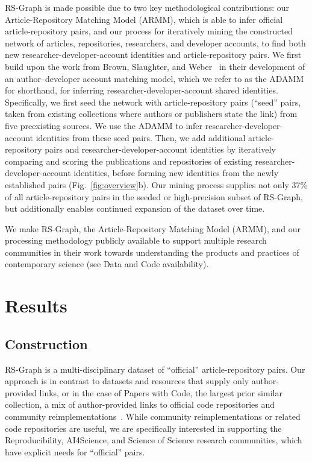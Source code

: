 \documentclass[pdflatex,sn-nature]{sn-jnl}%
\begin{document}
RS-Graph is made possible due to two key methodological contributions: our Article-Repository Matching Model (ARMM), which is able to infer official article-repository pairs, and our process for iteratively mining the constructed network of articles, repositories, researchers, and developer accounts, to find both new researcher-developer-account identities and article-repository pairs. We first build upon the work from Brown, Slaughter, and Weber~\cite{brown2026code} in their development of an author--developer account matching model, which we refer to as the ADAMM for shorthand, for inferring researcher-developer-account shared identities. Specifically, we first seed the network with article-repository pairs (``seed'' pairs, taken from existing collections where authors or publishers state the link) from five preexisting sources. We use the ADAMM to infer researcher-developer-account identities from these seed pairs. Then, we add additional article-repository pairs and researcher-developer-account identities by iteratively comparing and scoring the publications and repositories of existing researcher-developer-account identities, before forming new identities from the newly established pairs (Fig.~\ref{fig:overview}b). Our mining process supplies not only 37\% of all article-repository pairs in the seeded or high-precision subset of RS-Graph, but additionally enables continued expansion of the dataset over time.

We make RS-Graph, the Article-Repository Matching Model (ARMM), and our processing methodology publicly available to support multiple research communities in their work towards understanding the products and practices of contemporary science (see Data and Code availability).

\section{Results}\label{sec:results}

\subsection{Construction}\label{subsec:construction}

RS-Graph is a multi-disciplinary dataset of ``official'' article-repository pairs. Our approach is in contrast to datasets and resources that supply only author-provided links, or in the case of Papers with Code, the largest prior similar collection, a mix of author-provided links to official code repositories and community reimplementations~\cite{farber2023linked,ciuciukiss2025study,puangjaktha2024paper}. While community reimplementations or related code repositories are useful, we are specifically interested in supporting the Reproducibility, AI4Science, and Science of Science research communities, which have explicit needs for ``official'' pairs.
\end{document}
